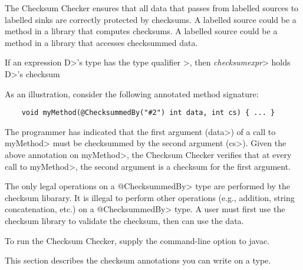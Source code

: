 \htmlhr
{}

The Checksum Checker ensures that all data that passes from labelled sources
to labelled sinks are correctly protected by checksums.
A labelled source could be a method in a library that computes checksums.
A labelled source could be a method in a library that accesses checksummed data.

If an expression \<D>'s type has the type qualifier
\<>,
then \<\small\emph{checksumexpr}> holds \<D>'s checksum

As an illustration, consider the following annotated method signature:
\begin{Verbatim}
    void myMethod(@ChecksummedBy("#2") int data, int cs) { ... }
\end{Verbatim}
The programmer has indicated that the first argument (\<data>) of a call to
\<myMethod> must be checksummed by the second argument (\<cs>).
Given the above annotation on \<myMethod>, the Checksum Checker verifies that at
every call to \<myMethod>, the second argument is a checksum for the first argument.

The only legal operations on a \<@ChecksummedBy> type are performed by the
checksum libarary.  It is illegal to perform other operations (e.g.,
addition, string concatenation, etc.) on a \<@ChecksummedBy> type.
A user must first use the checksum library to validate the checksum, then
can use the data.

To run the Checksum Checker, supply the
command-line option to javac.


This section describes the checksum annotations you can write on a type.


